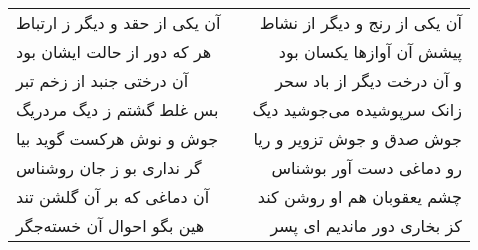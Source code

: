 \begin{center}
\begin{longtable}{l p{0.5cm} r}
\\
آن یکی از حقد و دیگر ز ارتباط
&&
آن یکی از رنج و دیگر از نشاط
\\
هر که دور از حالت ایشان بود
&&
پیشش آن آوازها یکسان بود
\\
آن درختی جنبد از زخم تبر
&&
و آن درخت دیگر از باد سحر
\\
بس غلط گشتم ز دیگ مردریگ
&&
زانک سرپوشیده می‌جوشید دیگ
\\
جوش و نوش هرکست گوید بیا
&&
جوش صدق و جوش تزویر و ریا
\\
گر نداری بو ز جان روشناس
&&
رو دماغی دست آور بوشناس
\\
آن دماغی که بر آن گلشن تند
&&
چشم یعقوبان هم او روشن کند
\\
هین بگو احوال آن خسته‌جگر
&&
کز بخاری دور ماندیم ای پسر
\\
\end{longtable}
\end{center}
